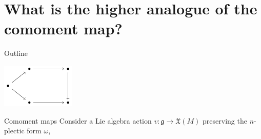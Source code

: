 \documentclass[10pt]{beamer}
\renewcommand{\checkpoint}[0]{
	\setcounter{tocdepth}{1}
	\addtocounter{framenumber}{-1}
 	\begin{frame}[t]{Outline}
  		\tableofcontents[currentsection]
		\begin{center}
			\includegraphics[width=3.5cm]{Pictures/Figure_pentagondiagm_page}
		\end{center}
	\end{frame}
}
\begin{document}
\section{What is the \textbf{higher analogue} of the \textbf{comoment map}?}
\checkpoint	

\begin{frame}[t]{Comoment maps}
	Consider a Lie algebra action $v:\mathfrak{g} \to \mathfrak{X}(M)$  preserving the $n$-plectic form $\omega$,
	\vfill


\end{frame}
\end{document}
